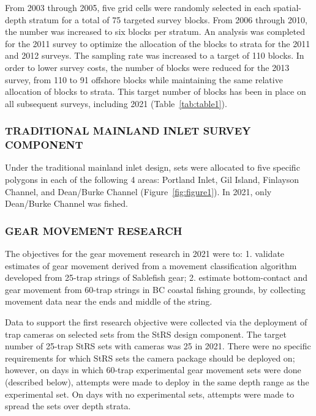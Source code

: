 \documentclass[12pt]{article}\usepackage[]{graphicx}\usepackage[]{color}
\begin{document}
From 2003 through 2005, five grid cells were randomly selected in each spatial-depth stratum for a total of 75 targeted survey blocks. From 2006 through 2010, the number was increased to six blocks per stratum. An analysis was completed for the 2011 survey to optimize the allocation of the blocks to strata for the 2011 and 2012 surveys. The sampling rate was increased to a target of 110 blocks. In order to lower survey costs, the number of blocks were reduced for the 2013 survey, from 110 to 91 offshore blocks while maintaining the same relative allocation of blocks to strata. This target number of blocks has been in place on all subsequent surveys, including 2021 (Table~\ref{tab:table1}).

\hypertarget{trad}{%
\subsubsection{TRADITIONAL MAINLAND INLET SURVEY COMPONENT}\label{trad}}

Under the traditional mainland inlet design, sets were allocated to five specific polygons in each of the following 4 areas: Portland Inlet, Gil Island, Finlayson Channel, and Dean/Burke Channel (Figure~\ref{fig:figure1}). In 2021, only Dean/Burke Channel was fished.

\hypertarget{gear}{%
\subsubsection{GEAR MOVEMENT RESEARCH}\label{gear}}

The objectives for the gear movement research in 2021 were to: 1. validate estimates of gear movement derived from a movement classification algorithm developed from 25-trap strings of Sablefish gear; 2. estimate bottom-contact and gear movement from 60-trap strings in BC coastal fishing grounds, by collecting movement data near the ends and middle of the string.

Data to support the first research objective were collected via the deployment of trap cameras on selected sets from the StRS design component. The target number of 25-trap StRS sets with cameras was 25 in 2021. There were no specific requirements for which StRS sets the camera package should be deployed on; however, on days in which 60-trap experimental gear movement sets were done (described below), attempts were made to deploy in the same depth range as the experimental set. On days with no experimental sets, attempts were made to spread the sets over depth strata.
\end{document}
